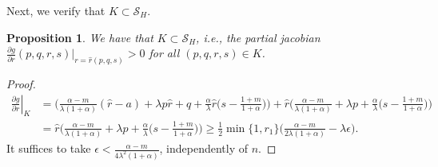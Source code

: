 \documentclass[usletter,11pt]{article}
\newtheorem{proposition}{Proposition}[section]
\theoremstyle{remark}
\begin{document}
Next, we verify that $K\subset \mathcal{S}_H$. 
\begin{proposition}
We have that $K\subset \mathcal{S}_H$, i.e., the partial jacobian $\frac{\partial g}{\partial r}(p,q,r,s)|_{r=\hat{r}(p,q,s)} >0 $ for all $(p,q,r,s)\in K$. %
\end{proposition}
\begin{proof}
 \begin{align*}
 \left.\frac{\partial g}{\partial r}\right|_{K} &= \Big(\frac{\alpha-m}{\lambda(1+\alpha)}(\hat{r}-a) + \lambda p\hat{r} + q +\frac{\alpha}{\lambda}\hat{r}\big(s- \frac{1+m}{1+\alpha}\big)\Big) + \hat{r}\Big(\frac{\alpha-m}{\lambda(1+\alpha)} + \lambda p + \frac{\alpha}{\lambda}\big(s- \frac{1+m}{1+\alpha}\big)\Big)\\
 &= \hat{r}\Big(\frac{\alpha-m}{\lambda(1+\alpha)} + \lambda p + \frac{\alpha}{\lambda}\big(s- \frac{1+m}{1+\alpha}\big) \Big)\ge \frac{1}{2}\min\{1,r_1\}\Big(\frac{\alpha-m}{2\lambda(1+\alpha)} - \lambda \epsilon\Big).
 \end{align*}
 It suffices to take $\epsilon < \frac{\alpha-m}{4\lambda^2(1+\alpha)}$, independently of $n$.
\end{proof}
\end{document}
